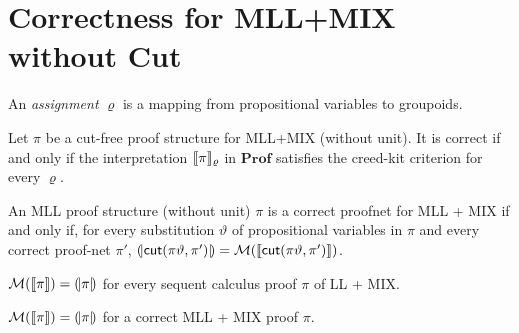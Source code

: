 \section{Correctness for \textsf{MLL+MIX} without Cut}


An \emph{assignment} \( \varrho \) is a mapping from propositional variables to groupoids.

\begin{theorem}
    Let \( \pi \) be a cut-free proof structure for \textsf{MLL+MIX} (without unit).
    It is correct if and only if the interpretation \( \llbracket{\pi}\rrbracket_\varrho \) in \( \mathbf{Prof} \) satisfies the creed-kit criterion for every \( \varrho \).
\end{theorem}


\begin{theorem}
    An MLL proof structure (without unit) \( \pi \) is a correct proofnet for MLL + MIX if and only if, for every substitution \( \vartheta \) of propositional variables in \( \pi \) and every correct proof-net \( \pi' \), \( (\!|{\mathsf{cut}(\pi\vartheta, \pi')}|\!) = \mathcal{M}({\llbracket{\mathsf{cut}(\pi\vartheta, \pi')}\rrbracket}) \). 
\end{theorem}


\begin{corollary}
    \( \mathcal{M}({\llbracket{\pi}\rrbracket}) = (\!|{\pi}|\!) \) for every sequent calculus proof \( \pi \) of LL + MIX.
\end{corollary}
\begin{corollary}
    \( \mathcal{M}({\llbracket{\pi}\rrbracket}) = (\!|{\pi}|\!) \) for a correct MLL + MIX proof \( \pi \). 
\end{corollary}

